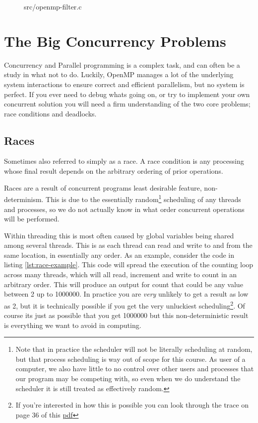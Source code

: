 \begin{figure}

{src/openmp-filter.c}
\end{figure}

\section{The Big Concurrency Problems}

Concurrency and Parallel programming is a complex task, and can often
be a study in what not to do. Luckily, OpenMP manages a lot of the
underlying system interactions to ensure correct and efficient
parallelism, but no system is perfect. If you ever need to debug whats
going on, or try to implement your own concurrent solution you will
need a firm understanding of the two core problems; race conditions
and deadlocks.

\subsection{Races}

\begin{definition}
  Sometimes also referred to simply as a race. A race condition is any processing whose final result depends on the arbitrary ordering of prior operations.
\end{definition}

Races are a result of concurrent programs least desirable feature, non-determinism. This is due to the essentially random\footnote{Note that in practice the scheduler will not be literally scheduling at random, but that process scheduling is way out of scope for this course. As user of a computer, we also have little to no control over other users and processes that our program may be competing with, so even when we do understand the scheduler it is still treated as effectively random.} scheduling of any threads and processes, so we do not actually know in what order concurrent operations will be performed.

Within threading this is most often caused by global variables being shared among several threads. This is as each thread can read and write to and from the same location, in essentially any order. As an example, consider the code in listing \ref{lst:race-example}. This code will spread the execution of the counting loop across many threads, which will all read, increment and write to count in an arbitrary order. This will produce an output for count that could be any value between 2 up to 1000000. In practice you are \textit{very} unlikely to get a result as low as 2, but it is technically possible if you get the very unluckiest scheduling\footnote{If you're interested in how this is possible you can look through the trace on page 36 of this \href{https://link.springer.com/content/pdf/10.1007/s00165-017-0447-x.pdf}{pdf}}. Of course its just as possible that you get 1000000 but this non-deterministic result is everything we want to avoid in computing. 

